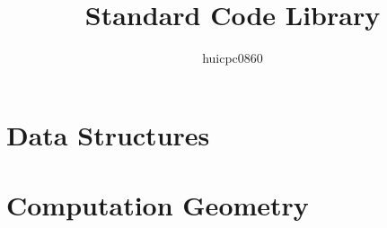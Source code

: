 \documentclass[12pt,sopenright,a3paper]{book}
\title{Standard Code Library}
\author{huicpc0860}
\begin{document}
	\thispagestyle{empty}
	\maketitle
	\newpage

	\thispagestyle{empty}
	\tableofcontents
	\newpage
	\thispagestyle{fancy}

	\mainmatter
	\chapter{Data Structures}
		\newpage
		
		
		
		
		
		
		
		
		
		
		
	\chapter{Computation Geometry}
		\newpage
		
		
		
		
		
		
		
		
		
		
		
		
		
		
\end{document}
